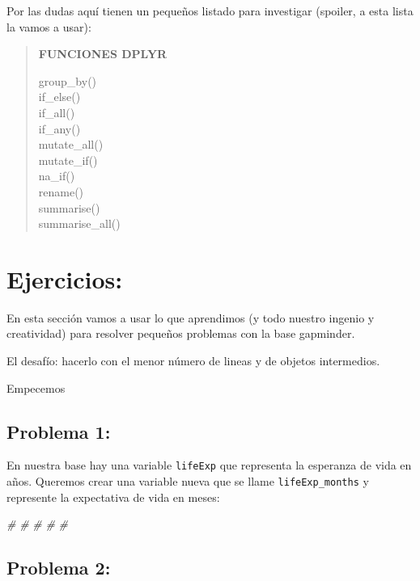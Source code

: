 \documentclass[
]{book}
\newenvironment{Shaded}{\begin{snugshade}}{\end{snugshade}}
\newcommand{\CommentTok}[1]{\textcolor[rgb]{0.56,0.35,0.01}{\textit{#1}}}
\begin{document}
Por las dudas aquí tienen un pequeños listado para investigar (spoiler, a esta lista la vamos a usar):

\begin{quote}
\textbf{FUNCIONES DPLYR}

group\_by()\\
if\_else()\\
if\_all()\\
if\_any()\\
mutate\_all()\\
mutate\_if()\\
na\_if()\\
rename()\\
summarise()\\
summarise\_all()
\end{quote}

\hypertarget{ejercicios-2}{%
\section{\texorpdfstring{ Ejercicios:}{ Ejercicios:}}\label{ejercicios-2}}

En esta sección vamos a usar lo que aprendimos (y todo nuestro ingenio y creatividad) para resolver pequeños problemas con la base gapminder.

El desafío: hacerlo con el menor número de lineas y de objetos intermedios.

Empecemos

\hypertarget{problema-1}{%
\subsection{Problema 1:}\label{problema-1}}

En nuestra base hay una variable \texttt{lifeExp} que representa la esperanza de vida en años. Queremos crear una variable nueva que se llame \texttt{lifeExp\_months} y represente la expectativa de vida en meses:

\begin{Shaded}
\begin{Highlighting}[]
\CommentTok{\#}
\CommentTok{\#}
\CommentTok{\#}
\CommentTok{\#}
\CommentTok{\#}
\end{Highlighting}
\end{Shaded}

\hypertarget{problema-2}{%
\subsection{Problema 2:}\label{problema-2}}
\end{document}

